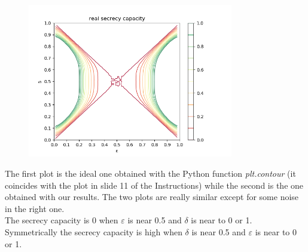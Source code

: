 \documentclass{report}
\begin{document}
\begin{figure}[H]
\centering
\includegraphics[width=0.8\textwidth]{plot5}
\end{figure}	

The first plot is the ideal one obtained with the Python function \textit{plt.contour} (it coincides with  the plot in slide 11 of the Instructions) while the second is the one obtained with our results. The two plots are really similar except for some noise in the right one.\\
The secrecy capacity is 0 when $\varepsilon$ is near 0.5 and $\delta$ is near to 0 or 1. Symmetrically the secrecy capacity is high when $\delta$ is near 0.5 and $\varepsilon$ is near to 0 or 1.
\end{document}
